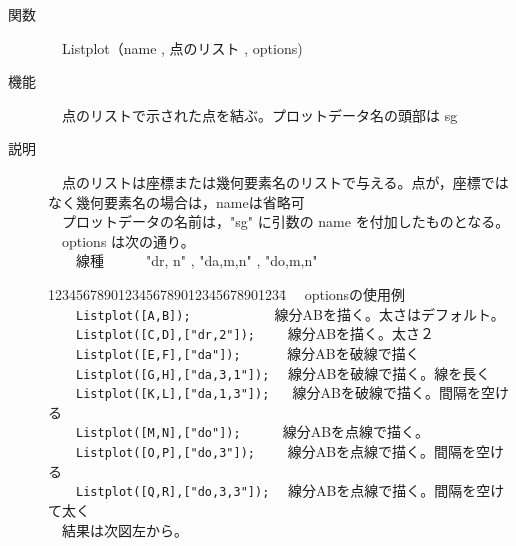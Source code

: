 \documentclass[papersize,a4paper,12pt,uplatex]{jsarticle}
\begin{document}
\begin{description}
\hypertarget{listplot}{}
\item[関数]　Listplot（name , 点のリスト , options)
\item[機能]　点のリストで示された点を結ぶ。プロットデータ名の頭部は sg
\item[説明]　点のリストは座標または幾何要素名のリストで与える。点が，座標ではなく幾何要素名の場合は，nameは省略可 \\
　プロットデータの名前は，"sg" に引数の name を付加したものとなる。\\
　options は次の通り。\\
　　線種　　　"dr, n"  , "da,m,n" , "do,m,n"
\begin{tabbing}
1234567890123456789012345678901234\=\kill
　optionsの使用例\\
　　\verb|Listplot([A,B]);|　　　　　　\>線分ABを描く。太さはデフォルト。\\
　　\verb|Listplot([C,D],["dr,2"]);|　　 \>線分ABを描く。太さ２\\
　　\verb|Listplot([E,F],["da"]);|　　　 \>線分ABを破線で描く\\
　　\verb|Listplot([G,H],["da,3,1"]);| 　\>線分ABを破線で描く。線を長く\\
　　\verb|Listplot([K,L],["da,1,3"]);| 　 \>線分ABを破線で描く。間隔を空ける\\
　　\verb|Listplot([M,N],["do"]);|　　　\>線分ABを点線で描く。\\
　　\verb|Listplot([O,P],["do,3"]);|　　 \>線分ABを点線で描く。間隔を空ける\\
　　\verb|Listplot([Q,R],["do,3,3"]);|　 \>線分ABを点線で描く。間隔を空けて太く\\
　結果は次図左から。
\end{tabbing}
　　


\end{description}
\end{document}
